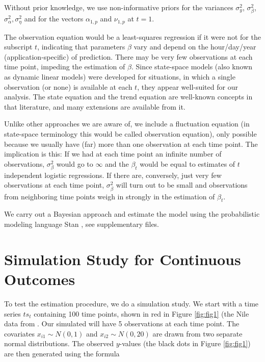 \documentclass{article}
\begin{document}
Without prior knowledge, we use non-informative priors for the variances $\sigma_y^2$, $\sigma^2_{\beta}$, $\sigma^2_{\alpha}, \sigma^2_{\eta}$ and for the vectors $\alpha_{1,p}$ and $\nu_{1,p}$ at $t=1$.

The observation equation would be a least-squares regression if it were not for the subscript $t$, indicating that parameters $\beta$ vary and depend on the hour/day/year (application-specific) of prediction. There may be very few observations at each time point, impeding the estimation of $\beta$. Since state-space models (also known as dynamic linear models) \citep{prado_time_2010, shumway_time_2011, durbin_time_2012} were developed for situations, in which a single observation (or none) is available at each $t$, they appear well-suited for our analysis. The state equation and the trend equation are well-known concepts in that literature, and many extensions are available from it.

Unlike other approaches we are aware of, we include a fluctuation equation (in state-space terminology this would be called observation equation), only possible because we usually have (far) more than one observation at each time point. The implication is this: If we had at each time point an infinite number of observations, $\sigma^2_\beta$ would go to $\infty$ and the $\beta_t$ would be equal to estimates of $t$ independent logistic regressions. If there are, conversely, just very few observations at each time point, $\sigma^2_\beta$ will turn out to be small and observations from neighboring time points weigh in strongly in the estimation of $\beta_t$.

We carry out a Bayesian approach and estimate the model using the probabilistic modeling language Stan \citep{stan_development_team_rstan_2021}, see supplementary files.

\section{Simulation Study for Continuous Outcomes}

To test the estimation procedure, we do a simulation study. We start with a time series $ts_t$ containing 100 time points, shown in red in Figure \ref{fig:fig1} (the Nile data from \citep{durbin_time_2012}. Our simulated will have 5 observations at each time point. The covariates $x_{i1} \sim N(0,1)$ and $x_{i2} \sim N(0, 20)$ are drawn from two separate normal distributions. The observed $y$-values (the black dots in Figure \ref{fig:fig1}) are then generated using the formula
\end{document}
